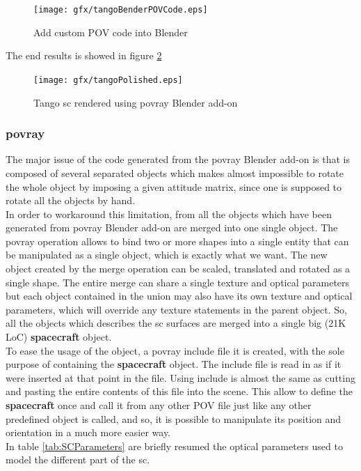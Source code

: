 \begin{figure}[H]
\centering
\texttt{[image: gfx/tangoBenderPOVCode.eps]}
\caption{Add custom POV code into Blender}
\label{fig:tangoblenderpov}
\end{figure}

The end results is showed in figure \ref{fig:tangoblenderfinal}

\begin{figure}[H]
\centering
\texttt{[image: gfx/tangoPolished.eps]}
\caption{Tango \acrshort{sc} rendered using \acrshort{povray} Blender add-on}
\label{fig:tangoblenderfinal}
\end{figure}

\subsubsection{\acrshort{povray}}
The major issue of the code generated from the  \acrshort{povray} Blender add-on is that is composed of several separated  objects which makes almost impossible to rotate the whole object by imposing a given attitude matrix, since one is supposed to rotate all the  objects by hand.\\
In order to workaround this limitation, from all the  objects which have been generated from \acrshort{povray} Blender add-on are merged into one single  object.
The  \acrshort{povray} operation allows to bind two or more shapes into a single entity that can be manipulated as a single object, which is exactly what we want. The new object created by the merge operation can be scaled, translated and rotated as a single shape. The entire merge can share a single texture and optical parameters but each object contained in the union may also have its own texture and optical parameters, which will override any texture statements in the parent object. So, all the  objects which describes the \acrshort{sc} surfaces are merged into a single big (21K LoC) \textbf{spacecraft}  object. \\
To ease the usage of the  object, a \acrshort{povray} include file it is created, with the sole purpose of containing the \textbf{spacecraft}  object.
The include file is read in as if it were inserted at that point in the file. Using include is almost the same as cutting and pasting the entire contents of this file into the scene. This allow to define the \textbf{spacecraft}  once and call it from any other POV file just like any other predefined object is called, and so, it is possible to manipulate its position and orientation in a much more easier way.\\
In table \ref{tab:SCParameters} are briefly resumed the optical parameters used to model the different part of the \acrshort{sc}.

